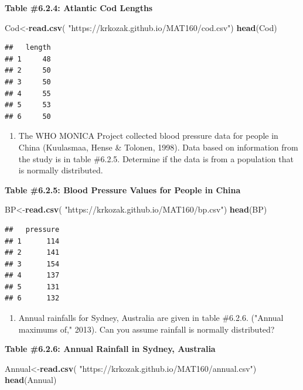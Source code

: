 \documentclass[
]{book}
\newenvironment{Shaded}{\begin{snugshade}}{\end{snugshade}}
\newcommand{\KeywordTok}[1]{\textcolor[rgb]{0.13,0.29,0.53}{\textbf{#1}}}
\newcommand{\NormalTok}[1]{#1}
\newcommand{\StringTok}[1]{\textcolor[rgb]{0.31,0.60,0.02}{#1}}
\providecommand{\tightlist}{%
  \setlength{\itemsep}{0pt}\setlength{\parskip}{0pt}}
\begin{document}
\textbf{Table \#6.2.4: Atlantic Cod Lengths}

\begin{Shaded}
\begin{Highlighting}[]
\NormalTok{Cod<-}\KeywordTok{read.csv}\NormalTok{(}
  \StringTok{"https://krkozak.github.io/MAT160/cod.csv"}\NormalTok{)}
\KeywordTok{head}\NormalTok{(Cod)}
\end{Highlighting}
\end{Shaded}

\begin{verbatim}
##   length
## 1     48
## 2     50
## 3     50
## 4     55
## 5     53
## 6     50
\end{verbatim}

\begin{enumerate}
\def\labelenumi{\arabic{enumi}.}
\setcounter{enumi}{2}
\tightlist
\item
  The WHO MONICA Project collected blood pressure data for people in China (Kuulasmaa, Hense \& Tolonen, 1998). Data based on information from the study is in table \#6.2.5. Determine if the data is from a population that is normally distributed.
\end{enumerate}

\textbf{Table \#6.2.5: Blood Pressure Values for People in China}

\begin{Shaded}
\begin{Highlighting}[]
\NormalTok{BP<-}\KeywordTok{read.csv}\NormalTok{(}
  \StringTok{"https://krkozak.github.io/MAT160/bp.csv"}\NormalTok{)}
\KeywordTok{head}\NormalTok{(BP)}
\end{Highlighting}
\end{Shaded}

\begin{verbatim}
##   pressure
## 1      114
## 2      141
## 3      154
## 4      137
## 5      131
## 6      132
\end{verbatim}

\begin{enumerate}
\def\labelenumi{\arabic{enumi}.}
\setcounter{enumi}{3}
\tightlist
\item
  Annual rainfalls for Sydney, Australia are given in table \#6.2.6. ("Annual maximums of," 2013). Can you assume rainfall is normally distributed?
\end{enumerate}

\textbf{Table \#6.2.6: Annual Rainfall in Sydney, Australia}

\begin{Shaded}
\begin{Highlighting}[]
\NormalTok{Annual<-}\KeywordTok{read.csv}\NormalTok{(}
  \StringTok{"https://krkozak.github.io/MAT160/annual.csv"}\NormalTok{)}
\KeywordTok{head}\NormalTok{(Annual)}
\end{Highlighting}
\end{Shaded}
\end{document}
